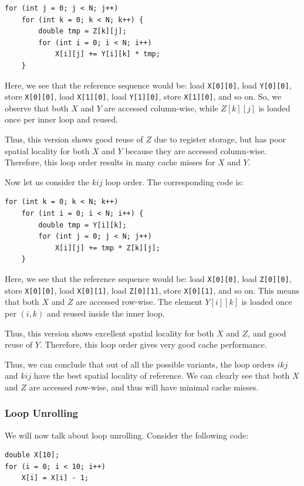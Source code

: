 \documentclass[12pt]{book}
\begin{document}
\begin{lstlisting}[style=cppstyle,caption={Matrix multiplication with loop order jki}, label={lst:jki-matmul}]
for (int j = 0; j < N; j++)
    for (int k = 0; k < N; k++) {
        double tmp = Z[k][j];
        for (int i = 0; i < N; i++)
            X[i][j] += Y[i][k] * tmp;
    }
\end{lstlisting}

Here, we see that the reference sequence would be: load \texttt{X[0][0]}, load \texttt{Y[0][0]}, store \texttt{X[0][0]}, load \texttt{X[1][0]}, load \texttt{Y[1][0]}, store \texttt{X[1][0]}, and so on. So, we observe that both $X$ and $Y$ are accessed column-wise, while $Z[k][j]$ is loaded once per inner loop and reused.

Thus, this version shows good reuse of $Z$ due to register storage, but has poor spatial locality for both $X$ and $Y$ because they are accessed column-wise. Therefore, this loop order results in many cache misses for $X$ and $Y$.

Now let us consider the $kij$ loop order. The corresponding code is:

\begin{lstlisting}[style=cppstyle,caption={Matrix multiplication with loop order kij}, label={lst:kij-matmul}]
for (int k = 0; k < N; k++)
    for (int i = 0; i < N; i++) {
        double tmp = Y[i][k];
        for (int j = 0; j < N; j++)
            X[i][j] += tmp * Z[k][j];
    }
\end{lstlisting}

Here, we see that the reference sequence would be: load \texttt{X[0][0]}, load \texttt{Z[0][0]}, store \texttt{X[0][0]}, load \texttt{X[0][1]}, load \texttt{Z[0][1]}, store \texttt{X[0][1]}, and so on. This means that both $X$ and $Z$ are accessed row-wise. The element $Y[i][k]$ is loaded once per $(i,k)$ and reused inside the inner loop.

Thus, this version shows excellent spatial locality for both $X$ and $Z$, and good reuse of $Y$. Therefore, this loop order gives very good cache performance.

Thus, we can conclude that out of all the possible variants, the loop orders $ikj$ and $kij$ have the best spatial locality of reference. We can clearly see that both $X$ and $Z$ are accessed row-wise, and thus will have minimal cache misses.

\subsubsection*{Loop Unrolling}
We will now talk about loop unrolling. Consider the following code:
\begin{lstlisting}[style=cppstyle,  caption = Loop Unrolling]
double X[10];
for (i = 0; i < 10; i++)
    X[i] = X[i] - 1;
\end{lstlisting}
\end{document}

